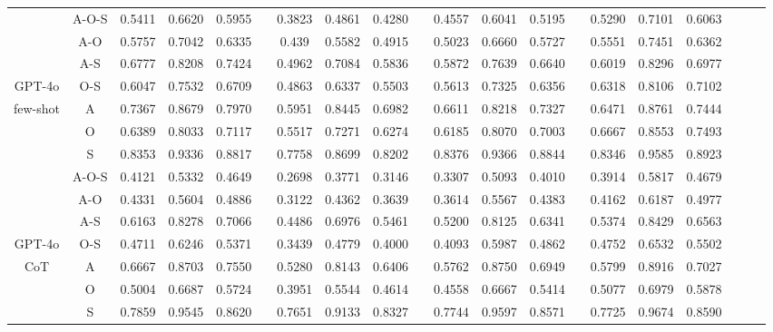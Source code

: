 \documentclass[11pt]{article}
\begin{document}
\begin{table}[ht]
{\begin{tabular}{cccccccccccccccccccc}
    \midrule
    & A-O-S & 0.5411 & 0.6620 & 0.5955 &       & 0.3823 & 0.4861 & 0.4280 &       & 0.4557 & 0.6041 & 0.5195 &       & 0.5290 & 0.7101 & 0.6063 \\
          & A-O   & 0.5757 & 0.7042 & 0.6335 &       & 0.439 & 0.5582 & 0.4915 &       & 0.5023 & 0.6660 & 0.5727 &       & 0.5551 & 0.7451 & 0.6362 \\
          & A-S   & 0.6777 & 0.8208 & 0.7424 &       & 0.4962 & 0.7084 & 0.5836 &       & 0.5872 & 0.7639 & 0.6640 &       & 0.6019 & 0.8296 & 0.6977 \\
          GPT-4o & O-S   & 0.6047 & 0.7532 & 0.6709 &       & 0.4863 & 0.6337 & 0.5503 &       & 0.5613 & 0.7325 & 0.6356 &       & 0.6318 & 0.8106 & 0.7102 \\
          few-shot & A     & 0.7367 & 0.8679 & 0.7970 &       & 0.5951 & 0.8445 & 0.6982 &       & 0.6611 & 0.8218 & 0.7327 &       & 0.6471 & 0.8761 & 0.7444 \\
          & O     & 0.6389 & 0.8033 & 0.7117 &       & 0.5517 & 0.7271 & 0.6274 &       & 0.6185 & 0.8070 & 0.7003 &       & 0.6667 & 0.8553 & 0.7493 \\
          & S     & 0.8353 & 0.9336 & 0.8817 &       & 0.7758 & 0.8699 & 0.8202 &       & 0.8376 & 0.9366 & 0.8844 &       & 0.8346 & 0.9585 & 0.8923 \\
    \midrule
          & A-O-S & 0.4121 & 0.5332 & 0.4649 &       & 0.2698 & 0.3771 & 0.3146 &       & 0.3307 & 0.5093 & 0.4010 &       & 0.3914 & 0.5817 & 0.4679 \\
          & A-O   & 0.4331 & 0.5604 & 0.4886 &       & 0.3122 & 0.4362 & 0.3639 &       & 0.3614 & 0.5567 & 0.4383 &       & 0.4162 & 0.6187 & 0.4977 \\
          & A-S   & 0.6163 & 0.8278 & 0.7066 &       & 0.4486 & 0.6976 & 0.5461 &       & 0.5200  & 0.8125 & 0.6341 &       & 0.5374 & 0.8429 & 0.6563 \\
          GPT-4o & O-S   & 0.4711 & 0.6246 & 0.5371 &       & 0.3439 & 0.4779 & 0.4000   &       & 0.4093 & 0.5987 & 0.4862 &       & 0.4752 & 0.6532 & 0.5502 \\
          CoT   & A     & 0.6667 & 0.8703 & 0.7550 &       & 0.5280 & 0.8143 & 0.6406 &       & 0.5762 & 0.8750 & 0.6949 &       & 0.5799 & 0.8916 & 0.7027 \\
          & O     & 0.5004 & 0.6687 & 0.5724 &       & 0.3951 & 0.5544 & 0.4614 &       & 0.4558 & 0.6667 & 0.5414 &       & 0.5077 & 0.6979 & 0.5878 \\
          & S     & 0.7859 & 0.9545 & 0.8620 &       & 0.7651 & 0.9133 & 0.8327 &       & 0.7744 & 0.9597 & 0.8571 &       & 0.7725 & 0.9674 & 0.8590 \\

\end{tabular}}
\end{table}
\end{document}
